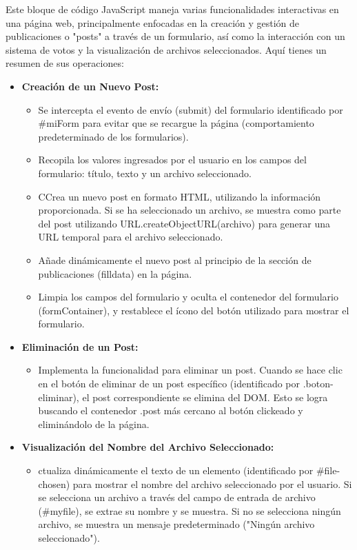 \documentclass{article}
\begin{document}
Este bloque de código JavaScript maneja varias funcionalidades interactivas en una página web, principalmente enfocadas en la creación y gestión de publicaciones o "posts" a través de un formulario, así como la interacción con un sistema de votos y la visualización de archivos seleccionados. Aquí tienes un resumen de sus operaciones:

\begin{itemize}
    \item \textbf{Creación de un Nuevo Post:}
    \begin{itemize}
        \item Se intercepta el evento de envío (submit) del formulario identificado por #miForm para evitar que se recargue la página (comportamiento predeterminado de los formularios).
        \item Recopila los valores ingresados por el usuario en los campos del formulario: título, texto y un archivo seleccionado.
        \item CCrea un nuevo post en formato HTML, utilizando la información proporcionada. Si se ha seleccionado un archivo, se muestra como parte del post utilizando URL.createObjectURL(archivo) para generar una URL temporal para el archivo seleccionado.
        \item Añade dinámicamente el nuevo post al principio de la sección de publicaciones (filldata) en la página.
        \item Limpia los campos del formulario y oculta el contenedor del formulario (formContainer), y restablece el ícono del botón utilizado para mostrar el formulario.
    \end{itemize}
    \item \textbf{Eliminación de un Post:}
    \begin{itemize}
        \item Implementa la funcionalidad para eliminar un post. Cuando se hace clic en el botón de eliminar de un post específico (identificado por .boton-eliminar), el post correspondiente se elimina del DOM. Esto se logra buscando el contenedor .post más cercano al botón clickeado y eliminándolo de la página.
    \end{itemize}
    \item \textbf{Visualización del Nombre del Archivo Seleccionado:}
    \begin{itemize}
        \item ctualiza dinámicamente el texto de un elemento (identificado por #file-chosen) para mostrar el nombre del archivo seleccionado por el usuario. Si se selecciona un archivo a través del campo de entrada de archivo (#myfile), se extrae su nombre y se muestra. Si no se selecciona ningún archivo, se muestra un mensaje predeterminado ("Ningún archivo seleccionado").
    \end{itemize}
\end{itemize}
\end{document}
